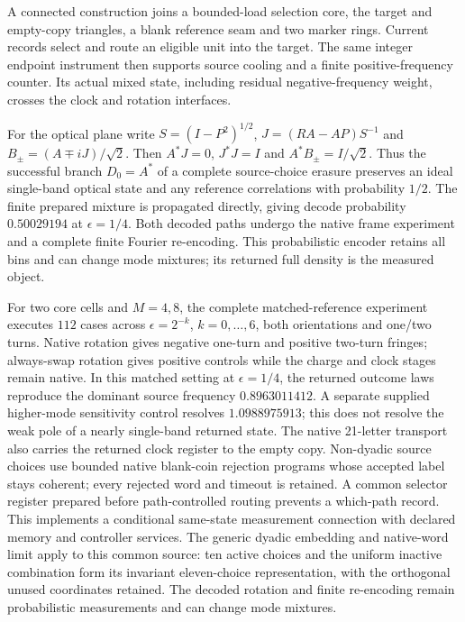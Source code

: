 A connected construction joins a bounded-load selection core, the target
and empty-copy triangles, a blank reference seam and two marker rings.
Current records select and route an eligible unit into the target. The same
integer endpoint instrument then supports source cooling and a finite
positive-frequency counter. Its actual mixed state, including residual
negative-frequency weight, crosses the clock and rotation interfaces.

For the optical plane write $S=(I-P^2)^{1/2}$,
$J=(RA-AP)S^{-1}$ and $B_\pm=(A\mp iJ)/\sqrt2$. Then
$A^*J=0$, $J^*J=I$ and $A^*B_\pm=I/\sqrt2$. Thus the successful branch
$D_0=A^*$ of a complete source-choice erasure preserves an ideal single-band
optical state and any reference correlations with probability $1/2$.
The finite prepared mixture is propagated directly, giving decode probability
$0.50029194$ at $\epsilon=1/4$. Both decoded paths undergo the native frame experiment and a
complete finite Fourier re-encoding. This probabilistic encoder retains all
bins and can change mode mixtures; its returned full density is the measured
object.

For two core cells and $M=4,8$, the complete matched-reference experiment executes $112$ cases
across $\epsilon=2^{-k}$, $k=0,\ldots,6$, both orientations and one/two turns.
Native rotation gives negative one-turn and positive two-turn fringes;
always-swap rotation gives positive controls while the charge and clock
stages remain native. In this matched setting at $\epsilon=1/4$, the returned outcome laws reproduce
the dominant source frequency $0.8963011412$. A separate supplied higher-mode
sensitivity control resolves $1.0988975913$; this does not resolve the weak
pole of a nearly single-band returned state.
The native 21-letter transport also carries the returned
clock register to the empty copy. Non-dyadic source choices use bounded native
blank-coin rejection programs whose accepted label stays coherent; every
rejected word and timeout is retained. A common selector register prepared
before path-controlled routing prevents a which-path record. This implements
a conditional same-state measurement connection with declared memory and
controller services. The generic dyadic embedding and native-word limit
apply to this common source: ten active choices and the uniform inactive
combination form its invariant eleven-choice representation, with the
orthogonal unused coordinates retained. The decoded rotation and finite
re-encoding remain probabilistic measurements and can change mode mixtures.

